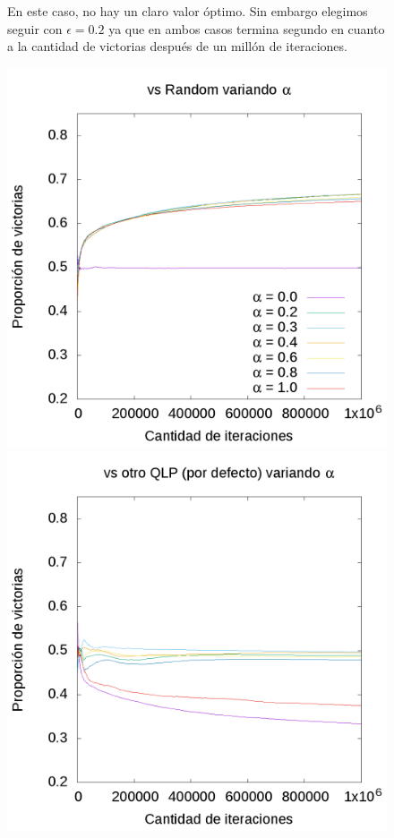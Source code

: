 \documentclass[10pt, a4paper]{article}
\begin{document}
\begin{figure}[H]
\begin{minipage}[c]{1\textwidth}
	\caption{En este caso, no  hay un claro valor óptimo. Sin embargo elegimos seguir con $\epsilon=0.2$ ya que en ambos casos termina segundo en cuanto a la cantidad de victorias después de un millón de iteraciones.}
  \end{minipage}
\end{figure}
\begin{figure}[H]
  \begin{minipage}[c]{1\textwidth}
	\includegraphics[scale=0.2]{AlphaR.png}
	\includegraphics[scale=0.2]{AlphaQ.png}

\end{minipage}
\end{figure}
\end{document}
